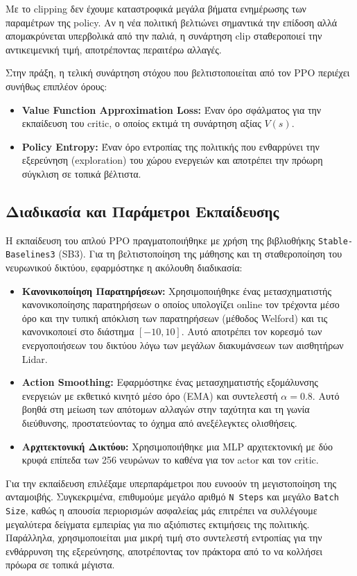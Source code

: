 \documentclass[acmsmall,screen,nonacm]{acmart}
\begin{document}
	Με το clipping δεν έχουμε καταστροφικά μεγάλα βήματα ενημέρωσης των παραμέτρων της policy. Αν η νέα πολιτική βελτιώνει σημαντικά την επίδοση αλλά απομακρύνεται υπερβολικά από την παλιά, η συνάρτηση $\text{clip}$ σταθεροποιεί την αντικειμενική τιμή, αποτρέποντας περαιτέρω αλλαγές. 

	Στην πράξη, η τελική συνάρτηση στόχου που βελτιστοποιείται από τον PPO περιέχει συνήθως επιπλέον όρους:
	\begin{itemize}
		\item \textbf{Value Function Approximation Loss:} Έναν όρο σφάλματος για την εκπαίδευση του critic, ο οποίος εκτιμά τη συνάρτηση αξίας $V(s)$.
		\item \textbf{Policy Entropy:} Έναν όρο εντροπίας της πολιτικής που ενθαρρύνει την εξερεύνηση (exploration) του χώρου ενεργειών και αποτρέπει την πρόωρη σύγκλιση σε τοπικά βέλτιστα.
	\end{itemize}

	\subsection{Διαδικασία και Παράμετροι Εκπαίδευσης}
	Η εκπαίδευση του απλού PPO πραγματοποιήθηκε με χρήση της βιβλιοθήκης \texttt{Stable-Baselines3} (SB3). Για τη βελτιστοποίηση της μάθησης και τη σταθεροποίηση του νευρωνικού δικτύου, εφαρμόστηκε η ακόλουθη διαδικασία:
	\begin{itemize}
		\item \textbf{Κανονικοποίηση Παρατηρήσεων:} Χρησιμοποιήθηκε ένας μετασχηματιστής κανονικοποίησης παρατηρήσεων ο οποίος υπολογίζει online τον τρέχοντα μέσο όρο και την τυπική απόκλιση των παρατηρήσεων (μέθοδος Welford) και τις κανονικοποιεί στο διάστημα $[-10, 10]$. Αυτό αποτρέπει τον κορεσμό των ενεργοποιήσεων του δικτύου λόγω των μεγάλων διακυμάνσεων των αισθητήρων Lidar.
		\item \textbf{Action Smoothing:} Εφαρμόστηκε ένας μετασχηματιστής εξομάλυνσης ενεργειών με εκθετικό κινητό μέσο όρο (EMA) και συντελεστή $\alpha = 0.8$. Αυτό βοηθά στη μείωση των απότομων αλλαγών στην ταχύτητα και τη γωνία διεύθυνσης, προστατεύοντας το όχημα από ανεξέλεγκτες ολισθήσεις.
		\item \textbf{Αρχιτεκτονική Δικτύου:} Χρησιμοποιήθηκε μια MLP αρχιτεκτονική με δύο κρυφά επίπεδα των 256 νευρώνων το καθένα για τον actor και τον critic.\\
	\end{itemize}
	
	
	Για την εκπαίδευση επιλέξαμε υπερπαράμετροι που ευνοούν τη μεγιστοποίηση της ανταμοιβής. Συγκεκριμένα, επιθυμούμε μεγάλο αριθμό \texttt{N Steps} και μεγάλο \texttt{Batch Size}, καθώς η απουσία περιορισμών ασφαλείας μάς επιτρέπει να συλλέγουμε μεγαλύτερα δείγματα εμπειρίας για πιο αξιόπιστες εκτιμήσεις της πολιτικής. Παράλληλα, χρησιμοποιείται μια μικρή τιμή στο συντελεστή εντροπίας για την ενθάρρυνση της εξερεύνησης, αποτρέποντας τον πράκτορα από το να κολλήσει πρόωρα σε τοπικά μέγιστα.\\
\end{document}
